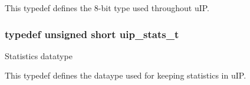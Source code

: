 This typedef defines the 8-\/bit type used throughout u\+I\+P. \hypertarget{group__uipopt_ga727459e5c4f777543c81ffffa3df3f0c}{
\subsubsection[{uip\+\_\+stats\+\_\+t}]{\setlength{\rightskip}{0pt plus 5cm}typedef unsigned short {\bf uip\+\_\+stats\+\_\+t}}}\label{group__uipopt_ga727459e5c4f777543c81ffffa3df3f0c}
Statistics datatype

This typedef defines the dataype used for keeping statistics in u\+I\+P. 